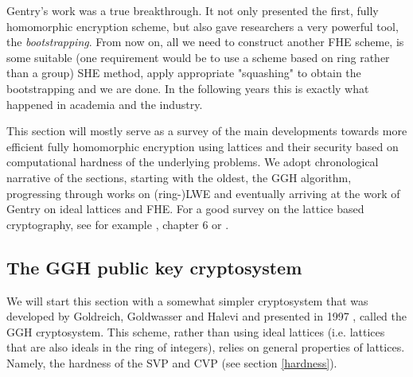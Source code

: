 Gentry's work was a true breakthrough. It not only presented the first, fully homomorphic encryption scheme, but also gave researchers a very powerful tool, the \textit{bootstrapping}. From now on, all we need to construct another FHE scheme, is some suitable (one requirement would be to use a scheme based on ring rather than a group) SHE method, apply appropriate "squashing" to obtain the bootstrapping and we are done. In the following years this is exactly what happened in academia and the industry.

This section will mostly serve as a survey of the main developments towards more efficient fully homomorphic encryption using lattices and their security based on computational hardness of the underlying problems. We adopt chronological narrative of the sections, starting with the oldest, the GGH algorithm, progressing through works on (ring-)LWE and eventually arriving at the work of Gentry \cite{gentry_phd} on ideal lattices and FHE. For a good survey on the lattice based cryptography, see for example \cite{two_faces}, \cite{book} chapter 6 or \cite{lattice-survey}.

\subsection{The GGH public key cryptosystem}
We will start this section with a somewhat simpler cryptosystem that was developed by Goldreich, Goldwasser and Halevi and presented in 1997 \cite{ggh}, called the GGH cryptosystem. This scheme, rather than using ideal lattices (i.e. lattices that are also ideals in the ring of integers), relies on general properties of lattices. Namely, the hardness of the SVP and CVP (see section \ref{hardness}).

